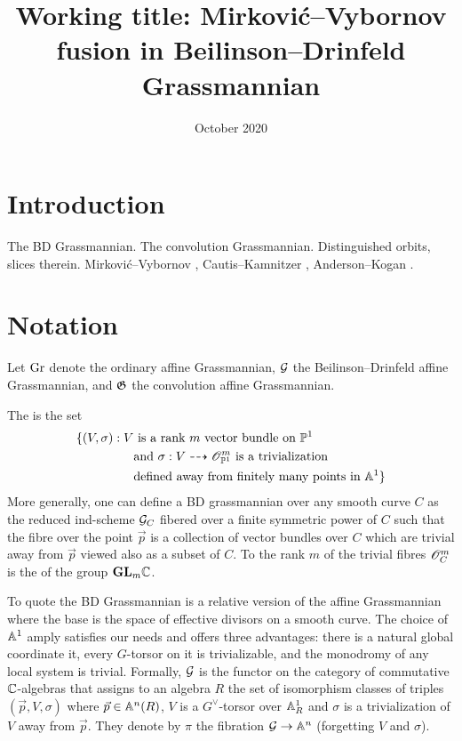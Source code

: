 \documentclass{article}
\title{Working title: Mirkovi\'c--Vybornov fusion in Beilinson--Drinfeld Grassmannian}
\date{October 2020}
\begin{document}
\maketitle

\section{Introduction}

The BD Grassmannian. The convolution Grassmannian. Distinguished orbits, slices therein. Mirkovi\'c--Vybornov \cite{mirkovic2007quiver,mirkovic2019comparison}, Cautis--Kamnitzer \cite{cautis2018categorical}, Anderson--Kogan \cite{anderson2005algebra}.

\section{Notation}

Let $\Gr$ denote the ordinary affine Grassmannian, $\Grbd$ the Beilinson--Drinfeld affine Grassmannian, and $\Grc$ the convolution affine Grassmannian. 

\begin{definition}
    The  is the set 
    \begin{equation}
        \label{eq:grbd}
    \begin{aligned}
        \{(V,\sigma) : V &\text{ is a rank } m \text{ vector bundle on }\PP^1 \\ &\text{and } \sigma: V \dashrightarrow \scO_{\PP^1}^m \text{ is a trivialization} \\
        &\text{defined away from finitely many points in }\AA^1\}
    \end{aligned}
    \end{equation}
    More generally, one can define a BD grassmannian over any smooth curve $C$ as the reduced ind-scheme $\Grbd_C$ fibered over a finite symmetric power of $C$ such that the fibre over the point $\vec p$ is a collection of vector bundles over $C$ which are trivial away from $\vec p$ viewed also as a subset of $C$. To \cite{mirkovic2019comparison} the rank $m$ of the trivial fibres $\scO_C^m$ is the of the group $\GL_m\CC$. 
\end{definition}

To quote \cite{baumann2020bases} the BD Grassmannian is a relative version of the affine Grassmannian where the base is the space of effective divisors on a smooth curve. The choice of $\AA^1$ amply satisfies our needs and offers three advantages: there is a natural global coordinate it, every $G$-torsor on it is trivializable, and the monodromy of any local system is trivial. Formally, $\Grbd$ is the functor on the category of commutative $\CC$-algebras that assigns to an algebra $R$ the set of isomorphism classes of triples $(\vec p,V,\sigma)$ where $\vec p\in \AA^n(R)$, $V$ is a $G^\vee$-torsor over $\AA^1_R$ and $\sigma$ is a trivialization of $V$ away from $\vec p$. They denote by $\pi$ the fibration $\Grbd\to\AA^n$ (forgetting $V$ and $\sigma$). 
\end{document}
